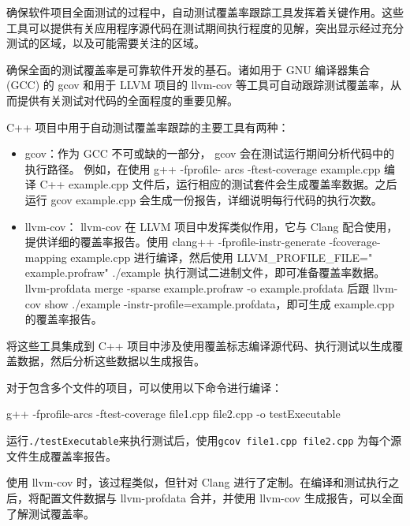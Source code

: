 
确保软件项目全面测试的过程中，自动测试覆盖率跟踪工具发挥着关键作用。这些工具可以提供有关应用程序源代码在测试期间执行程度的见解，突出显示经过充分测试的区域，以及可能需要关注的区域。


确保全面的测试覆盖率是可靠软件开发的基石。诸如用于 GNU 编译器集合 (GCC) 的 gcov 和用于 LLVM 项目的 llvm-cov 等工具可自动跟踪测试覆盖率，从而提供有关测试对代码的全面程度的重要见解。


C++ 项目中用于自动测试覆盖率跟踪的主要工具有两种：

\begin{itemize}
\item
gcov：作为 GCC 不可或缺的一部分， gcov 会在测试运行期间分析代码中的执行路径。
例如，在使用 g++ -fprofile- arcs -ftest-coverage example.cpp 编译 C++ example.cpp 文件后，运行相应的测试套件会生成覆盖率数据。之后运行 gcov example.cpp 会生成一份报告，详细说明每行代码的执行次数。

\item
llvm-cov： llvm-cov 在 LLVM 项目中发挥类似作用，它与 Clang 配合使用，提供详细的覆盖率报告。使用 clang++ -fprofile-instr-generate -fcoverage-mapping example.cpp 进行编译，然后使用 LLVM\_PROFILE\_FILE=" example.profraw" ./example 执行测试二进制文件，即可准备覆盖率数据。 llvm-profdata merge -sparse example.profraw -o example.profdata 后跟 llvm-cov show ./example -instr-profile=example.profdata，即可生成 example.cpp 的覆盖率报告。
\end{itemize}


将这些工具集成到 C++ 项目中涉及使用覆盖标志编译源代码、执行测试以生成覆盖数据，然后分析这些数据以生成报告。

对于包含多个文件的项目，可以使用以下命令进行编译：

\begin{shell}
g++ -fprofile-arcs -ftest-coverage file1.cpp file2.cpp -o testExecutable
\end{shell}

运行\verb|./testExecutable|来执行测试后，使用\verb|gcov file1.cpp file2.cpp| 为每个源文件生成覆盖率报告。

使用 llvm-cov 时，该过程类似，但针对 Clang 进行了定制。在编译和测试执行之后，将配置文件数据与 llvm-profdata 合并，并使用 llvm-cov 生成报告，可以全面了解测试覆盖率。

